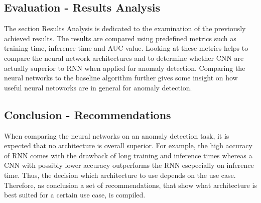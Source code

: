 \subsection{Evaluation - Results Analysis}
The section Results Analysis is dedicated to the examination of the previously achieved results. The results are compared using predefined metrics such as training time, inference time and AUC-value. Looking at these metrics helps to compare the neural network architectures and to determine whether CNN are actually superior to RNN when applied for anomaly detection. Comparing the neural networks to the baseline algorithm further gives some insight on how useful neural netoworks are in general for anomaly detection.

\subsection{Conclusion - Recommendations}
When comparing the neural networks on an anomaly detection task, it is expected that no architecture is overall superior. For example, the high accuracy of RNN comes with the drawback of long training and inference times whereas a CNN with possibly lower accuracy outperforms the RNN escpecially on inference time. Thus, the decision which architecture to use depends on the use case. Therefore, as conclusion a set of recommendations, that show what architecture is best suited for a certain use case, is compiled.


